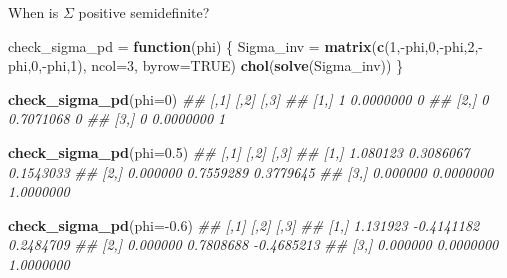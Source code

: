 \documentclass[11pt,ignorenonframetext,]{beamer}
\newenvironment{Shaded}{}{}
\newcommand{\CommentTok}[1]{\textcolor[rgb]{0.38,0.63,0.69}{\textit{#1}}}
\newcommand{\ControlFlowTok}[1]{\textcolor[rgb]{0.00,0.44,0.13}{\textbf{#1}}}
\newcommand{\DataTypeTok}[1]{\textcolor[rgb]{0.56,0.13,0.00}{#1}}
\newcommand{\DecValTok}[1]{\textcolor[rgb]{0.25,0.63,0.44}{#1}}
\newcommand{\FloatTok}[1]{\textcolor[rgb]{0.25,0.63,0.44}{#1}}
\newcommand{\KeywordTok}[1]{\textcolor[rgb]{0.00,0.44,0.13}{\textbf{#1}}}
\newcommand{\NormalTok}[1]{#1}
\newcommand{\OperatorTok}[1]{\textcolor[rgb]{0.40,0.40,0.40}{#1}}
\newcommand{\OtherTok}[1]{\textcolor[rgb]{0.00,0.44,0.13}{#1}}
\newcommand{\StringTok}[1]{\textcolor[rgb]{0.25,0.44,0.63}{#1}}
\let\oldShaded\Shaded
\let\endoldShaded\endShaded
\renewenvironment{Shaded}{\footnotesize\begin{spacing}{0.9}\oldShaded}{\endoldShaded\end{spacing}}
\begin{document}
\begin{frame}[fragile,t]{When is \(\Sigma\) positive semidefinite?}
\protect\hypertarget{when-is-sigma-positive-semidefinite}{}

\begin{Shaded}
\begin{Highlighting}[]
\NormalTok{check_sigma_pd =}\StringTok{ }\ControlFlowTok{function}\NormalTok{(phi) \{}
\NormalTok{  Sigma_inv =}\StringTok{ }\KeywordTok{matrix}\NormalTok{(}\KeywordTok{c}\NormalTok{(}\DecValTok{1}\NormalTok{,}\OperatorTok{-}\NormalTok{phi,}\DecValTok{0}\NormalTok{,}\OperatorTok{-}\NormalTok{phi,}\DecValTok{2}\NormalTok{,}\OperatorTok{-}\NormalTok{phi,}\DecValTok{0}\NormalTok{,}\OperatorTok{-}\NormalTok{phi,}\DecValTok{1}\NormalTok{), }\DataTypeTok{ncol=}\DecValTok{3}\NormalTok{, }\DataTypeTok{byrow=}\OtherTok{TRUE}\NormalTok{) }
  \KeywordTok{chol}\NormalTok{(}\KeywordTok{solve}\NormalTok{(Sigma_inv))}
\NormalTok{\}}

\KeywordTok{check_sigma_pd}\NormalTok{(}\DataTypeTok{phi=}\DecValTok{0}\NormalTok{)}
\CommentTok{##      [,1]      [,2] [,3]}
\CommentTok{## [1,]    1 0.0000000    0}
\CommentTok{## [2,]    0 0.7071068    0}
\CommentTok{## [3,]    0 0.0000000    1}

\KeywordTok{check_sigma_pd}\NormalTok{(}\DataTypeTok{phi=}\FloatTok{0.5}\NormalTok{)}
\CommentTok{##          [,1]      [,2]      [,3]}
\CommentTok{## [1,] 1.080123 0.3086067 0.1543033}
\CommentTok{## [2,] 0.000000 0.7559289 0.3779645}
\CommentTok{## [3,] 0.000000 0.0000000 1.0000000}

\KeywordTok{check_sigma_pd}\NormalTok{(}\DataTypeTok{phi=}\OperatorTok{-}\FloatTok{0.6}\NormalTok{)}
\CommentTok{##          [,1]       [,2]       [,3]}
\CommentTok{## [1,] 1.131923 -0.4141182  0.2484709}
\CommentTok{## [2,] 0.000000  0.7808688 -0.4685213}
\CommentTok{## [3,] 0.000000  0.0000000  1.0000000}
\end{Highlighting}
\end{Shaded}

\end{frame}
\end{document}
